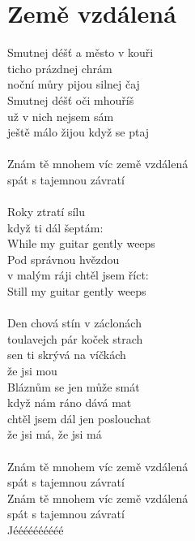 \section{Země vzdálená}
Smutnej déšť a město v kouři\\
ticho prázdnej chrám\\
noční můry pijou silnej čaj\\
Smutnej déšť oči mhouříš\\
už v nich nejsem sám\\
ještě málo žijou když se ptaj\\
\\
Znám tě mnohem víc země vzdálená \\
spát s tajemnou závratí \\
\\
Roky ztratí sílu\\
když ti dál šeptám:\\
While my guitar gently weeps\\
Pod správnou hvězdou\\
v malým ráji chtěl jsem říct:\\
Still my guitar gently weeps\\
\\
Den chová stín v záclonách\\
toulavejch pár koček strach\\
sen ti skrývá na víčkách\\
že jsi mou\\
Bláznům se jen může smát\\
když nám ráno dává mat\\
chtěl jsem dál jen poslouchat\\
že jsi má, že jsi má \\
\\
Znám tě mnohem víc země vzdálená\\
spát s tajemnou závratí \\
Znám tě mnohem víc země vzdálená\\
spát s tajemnou závratí \\
Jéééééééééé\\
